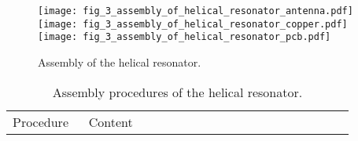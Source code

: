 \begin{figure}
    \centering
    {\texttt{[image: fig\_3\_assembly\_of\_helical\_resonator\_antenna.pdf]}}
    {\texttt{[image: fig\_3\_assembly\_of\_helical\_resonator\_copper.pdf]}}
    {\texttt{[image: fig\_3\_assembly\_of\_helical\_resonator\_pcb.pdf]}}
    \caption{Assembly of the helical resonator.}
    \label{fig:assembly_of_helical_resonator}
\end{figure}

\begin{table}
    \centering
    \caption{Assembly procedures of the helical resonator.}
    \begin{tabular}{p{0.2\linewidth}p{0.7\linewidth}}
        \toprule
        Procedure    & Content                                                                                                                                                                                                                    \\


\end{tabular}
\end{table}
